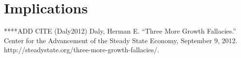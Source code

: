%
%
%



\chapter{Implications}
\label{chap:implications}

****ADD CITE (Daly2012) Daly, Herman E. ``Three More Growth Fallacies.'' Center for the Advancement of the Steady State Economy, September 9, 2012. http://steadystate.org/three-more-growth-fallacies/.




